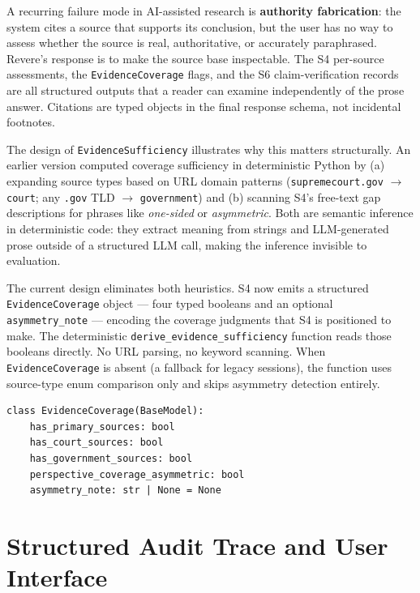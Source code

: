 \documentclass[11pt,letterpaper]{article}
\newcommand{\kw}[1]{\textbf{#1}}
\newcommand{\code}[1]{\texttt{\small #1}}
\newcommand{\file}[1]{\texttt{\small #1}}
\begin{document}
A recurring failure mode in AI-assisted research is \kw{authority fabrication}:
the system cites a source that supports its conclusion, but the user has no way
to assess whether the source is real, authoritative, or accurately paraphrased.
Revere's response is to make the source base inspectable. The S4 per-source
assessments, the \code{EvidenceCoverage} flags, and the S6 claim-verification
records are all structured outputs that a reader can examine independently of
the prose answer. Citations are typed objects in the final response schema, not
incidental footnotes.

The design of \code{EvidenceSufficiency} illustrates why this matters
structurally. An earlier version computed coverage sufficiency in deterministic
Python by (a) expanding source types based on URL domain patterns
(\code{supremecourt.gov} $\to$ \texttt{court}; any \code{.gov} TLD $\to$
\texttt{government}) and (b) scanning S4's free-text gap descriptions for
phrases like \textit{one-sided} or \textit{asymmetric}. Both are semantic
inference in deterministic code: they extract meaning from strings and
LLM-generated prose outside of a structured LLM call, making the inference
invisible to evaluation.

The current design eliminates both heuristics. S4 now emits a structured
\code{EvidenceCoverage} object --- four typed booleans and an optional
\code{asymmetry\_note} --- encoding the coverage judgments that S4 is
positioned to make. The deterministic \code{derive\_evidence\_sufficiency}
function reads those booleans directly. No URL parsing, no keyword scanning.
When \code{EvidenceCoverage} is absent (a fallback for legacy sessions),
the function uses source-type enum comparison only and skips asymmetry
detection entirely.

\begin{lstlisting}[caption={\code{EvidenceCoverage} schema
(\file{revere\_agent/schemas/source\_quality.py})}]
class EvidenceCoverage(BaseModel):
    has_primary_sources: bool
    has_court_sources: bool
    has_government_sources: bool
    perspective_coverage_asymmetric: bool
    asymmetry_note: str | None = None
\end{lstlisting}


\section{Structured Audit Trace and User Interface}
\label{sec:ui}
\end{document}
